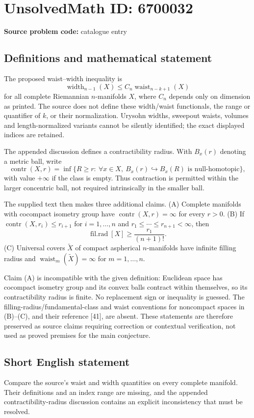 \documentclass[11pt]{article}
\begin{document}
\section*{UnsolvedMath ID: 6700032}
\textbf{Source problem code:} catalogue entry
\subsection{Definitions and mathematical statement}
The proposed waist--width inequality is
\[
\operatorname{width}_{n-1}(X)\leq C_n\operatorname{waist}_{n-k+1}(X)
\]
for all complete Riemannian $n$-manifolds $X$, where $C_n$ depends only on dimension as printed. The source does not define these width/waist functionals, the range or quantifier of $k$, or their normalization. Urysohn widths, sweepout waists, volumes and length-normalized variants cannot be silently identified; the exact displayed indices are retained.

The appended discussion defines a contractibility radius. With $B_x(r)$ denoting a metric ball, write
\[
\operatorname{contr}(X,r)=\inf\{R\geq r:\ \forall x\in X,\ B_x(r)\hookrightarrow B_x(R)\text{ is null-homotopic}\},
\]
with value $+\infty$ if the class is empty. Thus contraction is permitted within the larger concentric ball, not required intrinsically in the smaller ball.

The supplied text then makes three additional claims. (A) Complete manifolds with cocompact isometry group have $\operatorname{contr}(X,r)=\infty$ for every $r>0$. (B) If $\operatorname{contr}(X,r_i)\leq r_{i+1}$ for $i=1,\ldots,n$ and $r_1\leq\cdots\leq r_{n+1}<\infty$, then
\[
\operatorname{fil.rad}[X]\geq\frac{r_1}{(n+1)!}.
\]
(C) Universal covers $\widetilde X$ of compact aspherical $n$-manifolds have infinite filling radius and $\operatorname{waist}_m(\widetilde X)=\infty$ for $m=1,\ldots,n$.

Claim (A) is incompatible with the given definition: Euclidean space has cocompact isometry group and its convex balls contract within themselves, so its contractibility radius is finite. No replacement sign or inequality is guessed. The filling-radius/fundamental-class and waist conventions for noncompact spaces in (B)--(C), and their reference [41], are absent. These statements are therefore preserved as source claims requiring correction or contextual verification, not used as proved premises for the main conjecture.
\subsection{Short English statement}
Compare the source's waist and width quantities on every complete manifold. Their definitions and an index range are missing, and the appended contractibility-radius discussion contains an explicit inconsistency that must be resolved.
\end{document}

